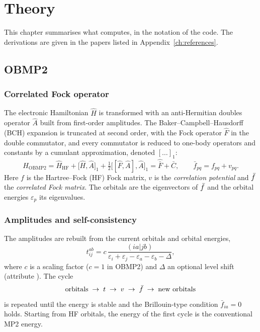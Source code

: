 \chapter{Theory}
\label{ch:theory}

This chapter summarises what \pycmf{} computes, in the notation of the code.
The derivations are given in the papers listed in
Appendix~\ref{ch:references}.

\section{OBMP2}
\label{sec:theory-obmp2}

\subsection{Correlated Fock operator}

The electronic Hamiltonian $\hat H$ is transformed with an anti-Hermitian
doubles operator $\hat A$ built from first-order amplitudes. The
Baker--Campbell--Hausdorff (BCH) expansion is truncated at second order, with
the Fock operator $\hat F$ in the double commutator, and every commutator is
reduced to one-body operators and constants by a cumulant approximation,
denoted $[\ldots]_1$:
\begin{equation}
  \hat H_{\mathrm{OBMP2}} = \hat H_{\mathrm{HF}} + \big[\hat H,\hat A\big]_1
  + \tfrac12\big[[\hat F,\hat A],\hat A\big]_1
  = \hat{\bar F} + \bar C ,
  \qquad \bar f_{pq} = f_{pq} + v_{pq}.
  \label{eq:hobmp2}
\end{equation}
Here $f$ is the Hartree--Fock (HF) Fock matrix, $v$ is the
\emph{correlation potential} and $\bar f$ the \emph{correlated Fock matrix}.
The orbitals are the eigenvectors of $\bar f$ and the orbital energies
$\varepsilon_p$ its eigenvalues.

\subsection{Amplitudes and self-consistency}

The amplitudes are rebuilt from the current orbitals and orbital energies,
\begin{equation}
  t^{ab}_{ij} = c\,
  \frac{(ia|jb)}{\varepsilon_i+\varepsilon_j-\varepsilon_a-\varepsilon_b-\Delta},
  \label{eq:amplitudes}
\end{equation}
where $c$ is a scaling factor ($c=1$ in OBMP2) and $\Delta$ an optional level
shift (attribute ). The cycle
\[
  \text{orbitals} \;\to\; t \;\to\; v \;\to\; \bar f \;\to\; \text{new orbitals}
\]
is repeated until the energy is stable and the Brillouin-type condition
$\bar f_{ia}=0$ holds. Starting from HF orbitals, the energy of the first
cycle is the conventional MP2 energy.

